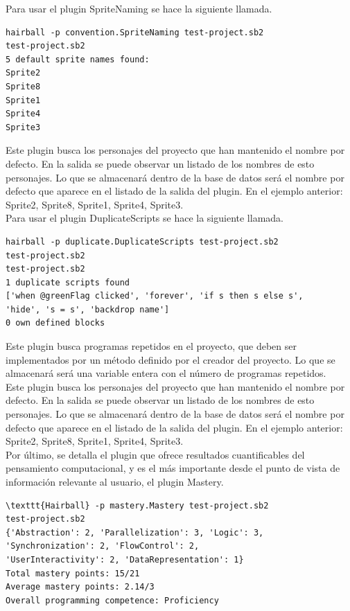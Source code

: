 \documentclass[a4paper, 12pt]{book}
\begin{document}
Para usar el plugin SpriteNaming se hace la siguiente llamada.
\begingroup
\fontsize{8pt}{9pt}\selectfont
\begin{verbatim}
hairball -p convention.SpriteNaming test-project.sb2 
test-project.sb2
5 default sprite names found:
Sprite2
Sprite8
Sprite1
Sprite4
Sprite3
\end{verbatim}
\endgroup

Este plugin busca los personajes del proyecto que han mantenido el nombre por defecto. En
la salida se puede observar un listado de los nombres de esto personajes. Lo que se 
almacenará dentro de la base de datos será el nombre por defecto que aparece en el listado
de la salida del plugin. En el ejemplo anterior: Sprite2, Sprite8, Sprite1, Sprite4, Sprite3. \\  

Para usar el plugin DuplicateScripts se hace la siguiente llamada.
\begingroup
\fontsize{8pt}{9pt}\selectfont
\begin{verbatim}
hairball -p duplicate.DuplicateScripts test-project.sb2 
test-project.sb2
test-project.sb2
1 duplicate scripts found
['when @greenFlag clicked', 'forever', 'if s then s else s',
'hide', 's = s', 'backdrop name']
0 own defined blocks
\end{verbatim}
\endgroup

Este plugin busca programas repetidos en el proyecto, que deben ser implementados por un
método definido por el creador del proyecto. Lo que se almacenará será una variable entera
con el número de programas repetidos. \\

Este plugin busca los personajes del proyecto que han mantenido el nombre por defecto. En
la salida se puede observar un listado de los nombres de esto personajes. Lo que se 
almacenará dentro de la base de datos será el nombre por defecto que aparece en el listado
de la salida del plugin. En el ejemplo anterior: Sprite2, Sprite8, Sprite1, Sprite4, Sprite3. \\


Por último, se detalla el plugin que ofrece resultados cuantificables del pensamiento 
computacional, y es el más importante desde el punto de vista de información relevante
al usuario, el plugin Mastery.

\begingroup
\fontsize{7pt}{8pt}\selectfont
\begin{verbatim}
\texttt{Hairball} -p mastery.Mastery test-project.sb2 
test-project.sb2
{'Abstraction': 2, 'Parallelization': 3, 'Logic': 3, 'Synchronization': 2, 'FlowControl': 2,
'UserInteractivity': 2, 'DataRepresentation': 1}
Total mastery points: 15/21
Average mastery points: 2.14/3
Overall programming competence: Proficiency
\end{verbatim}
\endgroup
\end{document}
